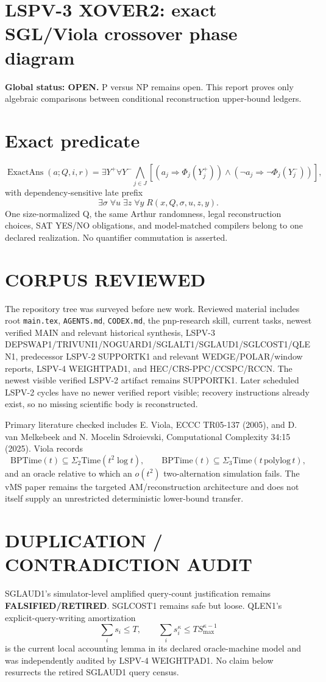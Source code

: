 \documentclass[11pt]{article}
\begin{document}
\section*{LSPV-3 XOVER2: exact SGL/Viola crossover phase diagram}
\textbf{Global status: OPEN.} P versus NP remains open. This report proves only algebraic comparisons between conditional reconstruction upper-bound ledgers.

\section*{Exact predicate}
\[
\operatorname{ExactAns}(a;Q,i,r)=\exists Y^+\forall Y^- \bigwedge_{j\in J}[(a_j\Rightarrow\Phi_j(Y_j^+))\wedge(\neg a_j\Rightarrow\neg\Phi_j(Y_j^-))],
\]
with dependency-sensitive late prefix
\[
\boxed{\exists\sigma\;\forall u\;\exists z\;\forall y\;R(x,Q,\sigma,u,z,y)}.
\]
One size-normalized Q, the same Arthur randomness, legal reconstruction choices, SAT YES/NO obligations, and model-matched compilers belong to one declared realization. No quantifier commutation is asserted.

\section*{CORPUS REVIEWED}
The repository tree was surveyed before new work. Reviewed material includes root \texttt{main.tex}, \texttt{AGENTS.md}, \texttt{CODEX.md}, the pnp-research skill, current tasks, newest verified MAIN and relevant historical synthesis, LSPV-3 DEPSWAP1/TRIVUNI1/NOGUARD1/SGLALT1/SGLAUD1/SGLCOST1/QLEN1, predecessor LSPV-2 SUPPORTK1 and relevant WEDGE/POLAR/window reports, LSPV-4 WEIGHTPAD1, and HEC/CRS-PPC/CCSPC/RCCN. The newest visible verified LSPV-2 artifact remains SUPPORTK1. Later scheduled LSPV-2 cycles have no newer verified report visible; recovery instructions already exist, so no missing scientific body is reconstructed.

Primary literature checked includes E. Viola, ECCC TR05-137 (2005), and D. van Melkebeek and N. Mocelin Sdroievski, Computational Complexity 34:15 (2025). Viola records
\[
\mathrm{BPTime}(t)\subseteq\Sigma_2\mathrm{Time}(t^2\log t),\qquad
\mathrm{BPTime}(t)\subseteq\Sigma_3\mathrm{Time}(t\,\mathrm{polylog}\,t),
\]
and an oracle relative to which an \(o(t^2)\) two-alternation simulation fails. The vMS paper remains the targeted AM/reconstruction architecture and does not itself supply an unrestricted deterministic lower-bound transfer.

\section*{DUPLICATION / CONTRADICTION AUDIT}
SGLAUD1's simulator-level amplified query-count justification remains \textbf{FALSIFIED/RETIRED}. SGLCOST1 remains safe but loose. QLEN1's explicit-query-writing amortization
\[
\sum_i s_i\le T,\qquad \sum_i s_i^\kappa\le T S_{\max}^{\kappa-1}
\]
is the current local accounting lemma in its declared oracle-machine model and was independently audited by LSPV-4 WEIGHTPAD1. No claim below resurrects the retired SGLAUD1 query census.
\end{document}
